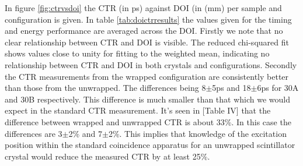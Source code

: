 In figure \ref{fig:ctrvsdoi} the CTR (in ps) against DOI (in (mm) per sample and configuration is given. In table \ref{tab:doictrresults} the values given for the timing and energy performance are averaged across the DOI. Firstly we note that no clear relationship between CTR and DOI is visible. The reduced chi-squared fit shows values close to unity for fitting to the weighted mean, indicating no relationship between CTR and DOI in both crystals and configurations. Secondly the CTR measurements from the wrapped configuration are consistently better than those from the unwrapped. The differences being 8$\pm$5ps and 18$\pm$6ps for 30A and 30B respectively. This difference is much smaller than that which we would expect in the standard CTR measurement. It's seen in [Table IV]\cite{r_Paganoni_Pauwels_et_al__2011} that the difference between wrapped and unwrapped CTR is about 33\%. In this case the differences are 3$\pm$2\% and 7$\pm$2\%. This implies that knowledge of the excitation position within the standard coincidence apparatus for an unwrapped scintillator crystal would reduce the measured CTR by at least 25\%. 

